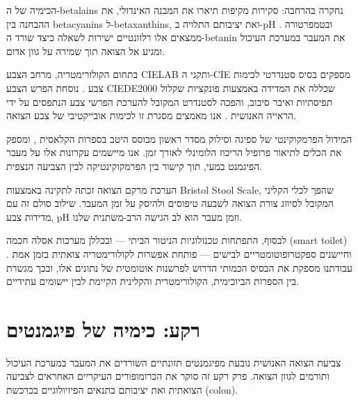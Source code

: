 \begin{hebrew}הכימיה של ה-\textenglish{betalains} נחקרה בהרחבה: סקירות מקיפות תיארו את המבנה האינדולי, את ההבחנה בין \textenglish{betacyanins} ל-\textenglish{betaxanthins}, ואת יציבותם התלויה ב-\textenglish{pH} ובטמפרטורה \cite{betalain}. ממצאים אלו רלוונטיים ישירות לשאלה כיצד שורד ה-\textenglish{betanin} את המעבר במערכת העיכול ומגיע אל הצואה תוך שמירה על גוון אדום.\end{hebrew}

\begin{hebrew}בתחום הקולורימטריה, מרחב הצבע \textenglish{CIELAB} ותקני ה-\textenglish{CIE} מספקים בסיס סטנדרטי לכימות צבע \cite{cie2004}. נוסחת הפרש הצבע \textenglish{CIEDE2000} שכללה את המדידה באמצעות פונקציות שקלול תפיסתיות ואיבר סיבוב, והפכה לסטנדרט המקובל להערכת הפרשי צבע הנתפסים על ידי הראייה האנושית \cite{ciede2000}. אנו מאמצים מסגרת זו לכימות אובייקטיבי של צבע הצואה.\end{hebrew}

\begin{hebrew}המידול הפרמקוקינטי של ספיגה וסילוק מסדר ראשון מבוסס היטב בספרות הקלאסית \cite{rowland2011}, ומספק את הכלים לתיאור פרופיל הריכוז הלומינלי לאורך זמן. אנו מיישמים עקרונות אלו על מעבר הפיגמנט במעי, תוך קישור בין הפרמקוקינטיקה לבין הצביעה הנצפית.\end{hebrew}

\begin{hebrew}הערכת מרקם הצואה זכתה לתקינה באמצעות \textenglish{Bristol Stool Scale}, שהפך לכלי הקליני המקובל לסיווג צורת הצואה לשבעה טיפוסים ולהיסק על זמן המעבר. שילוב סולם זה עם מדידות צבע, \textenglish{pH} וזמן מעבר הוא לב הגישה הרב-משתנית שלנו.\end{hebrew}

\begin{hebrew}לבסוף, התפתחות טכנולוגיות הניטור הביתי — ובכללן מערכות אסלה חכמה (\textenglish{smart toilet}) וחיישנים ספקטרופוטומטריים לבישים — פותחת אפשרות לקולורימטריה צואתית בזמן אמת \cite{park2020}. עבודתנו מספקת את הבסיס הכמותי הדרוש לפרשנות אוטומטית של נתונים אלו, ובכך מגשרת בין הספרות הביוכימית, הקולורימטרית והקלינית הקיימת לבין יישומים עתידיים.\end{hebrew}

\section{\texthebrew{רקע: כימיה של פיגמנטים}}

\begin{hebrew}צביעת הצואה האנושית נובעת מפיגמנטים תזונתיים השורדים את המעבר במערכת העיכול ותורמים לגוון הצואה. פרק רקע זה סוקר את הכרומופורים העיקריים האחראים לצביעה הצואתית ואת יציבותם בתנאים הפיזיולוגיים בכרכשת (\textenglish{colon}).\end{hebrew}

